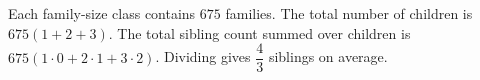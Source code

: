 Each family-size class contains $675$ families. The total number of children is $675(1+2+3)$. The total sibling count summed over children is $675(1\cdot0+2\cdot1+3\cdot2)$. Dividing gives $\boxed{\dfrac{4}{3}}$ siblings on average.
